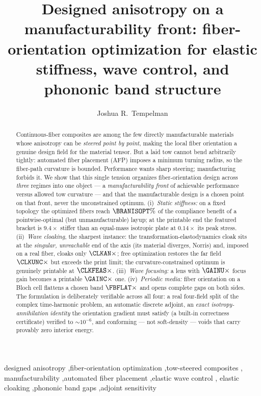 \documentclass[preprint,11pt]{elsarticle}
\theoremstyle{plain}\newtheorem{proposition}{Proposition}
\theoremstyle{remark}\newtheorem{remark}{Remark}
\begin{document}
\begin{frontmatter}

\title{Designed anisotropy on a manufacturability front: fiber-orientation optimization
for elastic stiffness, wave control, and phononic band structure}

\author{Joshua R.~Tempelman}

\begin{abstract}
Continuous-fiber composites are among the few directly manufacturable materials whose
anisotropy can be \emph{steered point by point}, making the local fiber orientation a
genuine design field for the material tensor. But a laid tow cannot bend arbitrarily
tightly: automated fiber placement (AFP) imposes a minimum turning radius, so the
fiber-path curvature is bounded. Performance wants sharp steering; manufacturing forbids
it. We show that this single tension organizes fiber-orientation design across
\emph{three} regimes into one object --- a \emph{manufacturability front} of achievable
performance versus allowed tow curvature --- and that the manufacturable design is a
chosen point on that front, never the unconstrained optimum. (i)~\emph{Static stiffness:}
on a fixed topology the optimized fibers reach $\BRANISOPT\%$ of the compliance benefit of
a pointwise-optimal (but unmanufacturable) layup; at the printable end the featured
bracket is $9.4\times$ stiffer than an equal-mass isotropic plate at $0.14\times$ its peak
stress. (ii)~\emph{Wave cloaking}, the sharpest instance: the transformation-elastodynamics
cloak sits at the \emph{singular, unreachable} end of the axis (its material diverges,
Norris) and, imposed on a real fiber, cloaks only $\CLKAN\times$; free optimization
restores the far field $\CLKUNC\times$ but exceeds the print limit; the
curvature-constrained optimum is genuinely printable at $\CLKFEAS\times$. (iii)~\emph{Wave
focusing:} a lens with $\GAINU\times$ focus gain becomes a printable $\GAINC\times$ one.
(iv)~\emph{Periodic media:} fiber orientation on a Bloch cell flattens a chosen band
$\FBFLAT\times$ and opens complete gaps on both sides. The formulation is deliberately
verifiable across all four: a real four-field split of the complex time-harmonic problem,
an automatic discrete adjoint, an \emph{exact isotropy-annihilation identity} the
orientation gradient must satisfy (a built-in correctness certificate) verified to
$\sim\!10^{-6}$, and conforming --- not soft-density --- voids that carry provably zero
interior energy.
\end{abstract}

\begin{keyword}
designed anisotropy \sep fiber-orientation optimization \sep tow-steered composites \sep
manufacturability \sep automated fiber placement \sep elastic wave control \sep
elastic cloaking \sep phononic band gaps \sep adjoint sensitivity
\end{keyword}

\end{frontmatter}
\end{document}

